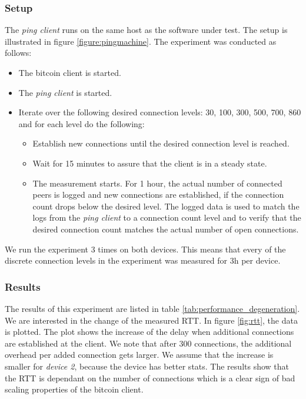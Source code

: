 \subsubsection{Setup}
The \textit{ping client} runs on the same host as the software under test. The setup is illustrated in figure \ref{figure:pingmachine}. The experiment was conducted as follows:
\begin{itemize}
	\item The bitcoin client is started.
	\item The \textit{ping client} is started.
	\item Iterate over the following desired connection levels: 30, 100, 300, 500, 700, 860 and for each level do the following:
	\begin{itemize}
	\item Establish new connections until the desired connection level is reached.
	\item Wait for 15 minutes to assure that the client is in a steady state.
	\item The measurement starts. For 1 hour, the actual number of connected peers is logged and new connections are established, if the connection count drops below the desired level. The logged data is used to match the logs from the \textit{ping client} to a connection count level and to verify that the desired connection count matches the actual number of open connections.  
	\end{itemize}
\end{itemize}
We run the experiment 3 times on both devices. This means that every of the discrete connection levels in the experiment was measured for 3h per device.\\


\subsubsection{Results}
The results of this experiment are listed in table \ref{tab:performance_degeneration}. We are interested in the change of the measured RTT.  In figure \ref{fig:rtt}, the data is plotted. The plot shows the increase of the delay when additional connections are established at the client. We note that after 300 connections, the additional overhead per added connection gets larger. We assume that the increase is smaller for \textit{device 2}, because the device has better stats. The results show that the RTT is dependant on the number of connections which is a clear sign of bad scaling properties of the bitcoin client.\\

